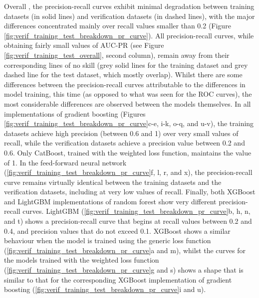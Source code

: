Overall , the precision-recall curves exhibit minimal degradation between \textcolor{colourTraining}{training datasets} (in solid lines) and \textcolor{colourTest}{verification datasets} (in dashed lines), with the major differences concentrated mainly over recall values smaller than 0.2 (Figure \ref{fig:verif_training_test_breakdown_pr_curve}). All precision-recall curves, while obtaining fairly small values of AUC-PR (see Figure \ref{fig:verif_training_test_overall}, second column), remain away from their corresponding lines of no skill (grey solid lines for the training dataset and grey dashed line for the test dataset, which mostly overlap). Whilst there are some differences between the precision-recall curves attributable to the differences in model training, this time (as opposed to what was seen for the ROC curves), the most considerable differences are observed between the models themselves. In all implementations of gradient boosting (Figures \ref{fig:verif_training_test_breakdown_pr_curve}c-e, i-k, o-q, and u-v), the \textcolor{colourTraining}{training datasets} achieve high precision (between 0.6 and 1) over very small values of recall, while the \textcolor{colourTest}{verification datasets} achieve a precision value between 0.2 and 0.6. Only CatBoost, trained with the weighted loss function, maintains the value of 1. In the feed-forward neural network (\ref{fig:verif_training_test_breakdown_pr_curve}f, l, r, and x), the precision-recall curve remains virtually identical between the \textcolor{colourTraining}{training datasets} and the \textcolor{colourTest}{verification datasets}, including at very low values of recall. Finally, both XGBoost and LightGBM implementations of random forest show very different precision-recall curves. LightGBM (\ref{fig:verif_training_test_breakdown_pr_curve}b, h, n, and t) shows a precision-recall curve that begins at recall values between 0.2 and 0.4, and precision values that do not exceed 0.1. XGBoost shows a similar behaviour when the model is trained using the generic loss function (\ref{fig:verif_training_test_breakdown_pr_curve}a and m), whilst the curves for the models trained with the weighted loss function (\ref{fig:verif_training_test_breakdown_pr_curve}g and s) shows a shape that is similar to that for the corresponding XGBoost implementation of gradient boosting (\ref{fig:verif_training_test_breakdown_pr_curve}i and u).

